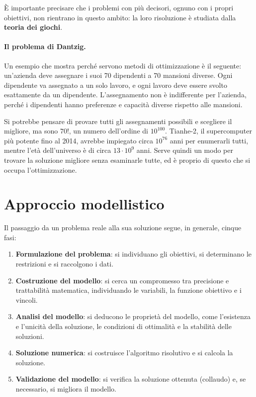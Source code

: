È importante precisare che i problemi con più decisori, ognuno con i propri obiettivi, non rientrano in questo ambito: la loro risoluzione è studiata dalla \textbf{teoria dei giochi}.

\paragraph{Il problema di Dantzig.}
Un esempio che mostra perché servono metodi di ottimizzazione è il seguente: un'azienda deve assegnare i suoi 70 dipendenti a 70 mansioni diverse. Ogni dipendente va assegnato a un solo lavoro, e ogni lavoro deve essere svolto esattamente da un dipendente. L'assegnamento non è indifferente per l'azienda, perché i dipendenti hanno preferenze e capacità diverse rispetto alle mansioni.

Si potrebbe pensare di provare tutti gli assegnamenti possibili e scegliere il migliore, ma sono $70!$, un numero dell'ordine di $10^{100}$. Tianhe-2, il supercomputer più potente fino al 2014, avrebbe impiegato circa $10^{76}$ anni per enumerarli tutti, mentre l'età dell'universo è di circa $13 \cdot 10^9$ anni. Serve quindi un modo per trovare la soluzione migliore senza esaminarle tutte, ed è proprio di questo che si occupa l'ottimizzazione.

\section{Approccio modellistico}
Il passaggio da un problema reale alla sua soluzione segue, in generale, cinque fasi:
\begin{enumerate}
    \item \textbf{Formulazione del problema}: si individuano gli obiettivi, si determinano le restrizioni e si raccolgono i dati.
    \item \textbf{Costruzione del modello}: si cerca un compromesso tra precisione e trattabilità matematica, individuando le variabili, la funzione obiettivo e i vincoli.
    \item \textbf{Analisi del modello}: si deducono le proprietà del modello, come l'esistenza e l'unicità della soluzione, le condizioni di ottimalità e la stabilità delle soluzioni.
    \item \textbf{Soluzione numerica}: si costruisce l'algoritmo risolutivo e si calcola la soluzione.
    \item \textbf{Validazione del modello}: si verifica la soluzione ottenuta (collaudo) e, se necessario, si migliora il modello.
\end{enumerate}

